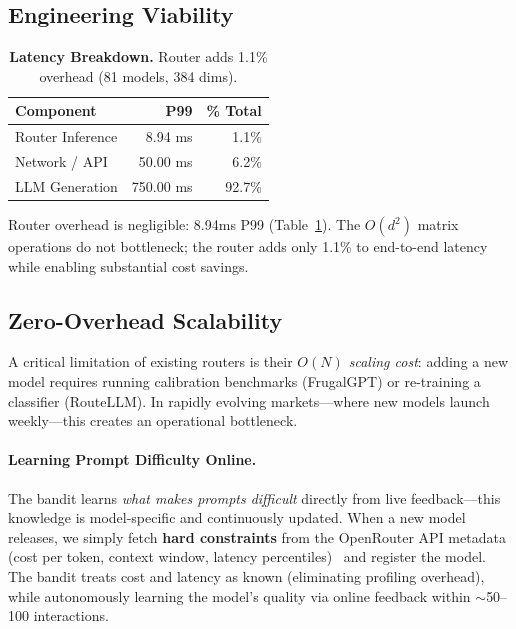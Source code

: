 \subsection{Engineering Viability}
\label{sec:engineering}

\begin{table}[t]
\centering
\small
\caption{\textbf{Latency Breakdown.} Router adds 1.1\% overhead (81 models, 384 dims).}
\label{tab:latency}
\begin{tabular}{lrr}
\toprule
\textbf{Component} & \textbf{P99} & \textbf{\% Total} \\
\midrule
Router Inference & 8.94 ms & 1.1\% \\
Network / API & 50.00 ms & 6.2\% \\
LLM Generation & 750.00 ms & 92.7\% \\
\bottomrule
\end{tabular}
\end{table}

Router overhead is negligible: 8.94ms P99 (Table~\ref{tab:latency}). The $O(d^2)$ matrix operations do not bottleneck; the router adds only 1.1\% to end-to-end latency while enabling substantial cost savings.

\subsection{Zero-Overhead Scalability}
\label{sec:scalability}

A critical limitation of existing routers is their \emph{$O(N)$ scaling cost}: adding a new model requires running calibration benchmarks (FrugalGPT) or re-training a classifier (RouteLLM). In rapidly evolving markets---where new models launch weekly---this creates an operational bottleneck.

\paragraph{Learning Prompt Difficulty Online.} The bandit learns \emph{what makes prompts difficult} directly from live feedback---this knowledge is model-specific and continuously updated. When a new model releases, we simply fetch \textbf{hard constraints} from the OpenRouter API metadata (cost per token, context window, latency percentiles)~\cite{openrouter2024pricing} and register the model. The bandit treats cost and latency as known (eliminating profiling overhead), while autonomously learning the model's quality via online feedback within $\sim$50--100 interactions.

